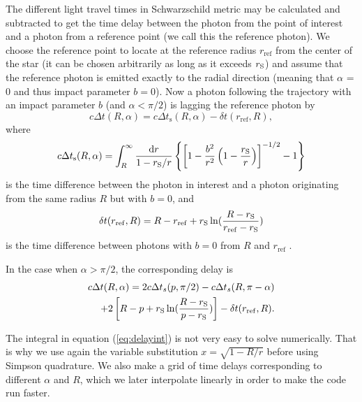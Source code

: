 \documentclass{wihuri}
\def\rg{r_{\rm S}} %
\def\be{\begin{equation}}
\def\ee{\end{equation}}
\def\d{{\rm d}}
\def\rg{r_{\rm S}} %
\begin{document}
The different light travel times in Schwarzschild metric may be calculated and subtracted to get the time delay between the photon from the point of interest and a photon from a reference point (we call this the reference photon). We choose the reference point to locate at the reference radius $r_{\mathrm{ref}}$ from the center of the star (it can be chosen arbitrarily as long as it exceeds $\rg$) and assume that the reference photon is emitted exactly to the radial direction (meaning that $\alpha$ = 0 and thus impact parameter $b = 0$). Now a photon following the trajectory with an impact parameter $b$ (and $\alpha < \pi/2$) is lagging the reference photon by 
\cite{pechenick}
\be \label{eq:delay2}
c\Delta t(R,\alpha)=  c\Delta t_{\mathrm{s}}(R,\alpha) -\delta t(r_{\mathrm{ref}},R),
\ee
where 
\be \label{eq:delayint}
c\Delta t_{\mathrm{s}}(R,\alpha) =
\int_R^{\infty} \frac{\d r}{1- \rg/r}
\left\{ \left[ 1-  \frac{b^2}{r^2}  \left( 1- \frac{\rg}{r} \right)
\right] ^{-1/2}  -1 \right\}
\ee
is the time difference between the photon in interest and a photon originating from the same radius $R$ but with $b=0$, and
\be
\delta t(r_{\mathrm{ref}},R) = R-r_{\mathrm{ref}}+\rg\ln(\frac{R-\rg}{r_{\mathrm{ref}}-\rg})
\ee
is the time difference between photons with $b=0$ from $R$ and $r_{\mathrm{ref}}$ \cite{falkner}. 

In the case when $\alpha > \pi/2$, the corresponding delay is
\be\label{eq:delay22}
\begin{split}
c\Delta t(R,\alpha)= 2c\Delta t_{s}(p,\pi/2)-c\Delta t_{s}(R,\pi-\alpha)\\+2\left[ R-p+\rg\ln(\frac{R-\rg}{p-\rg})\right]-\delta t(r_{\mathrm{ref}},R).
\end{split}
\ee

The integral in equation (\ref{eq:delayint}) is not very easy to solve numerically. That is why we use again the variable substitution $x = \sqrt{1-R/r}$ before using Simpson quadrature. We also make a grid of time delays corresponding to different $\alpha$ and $R$, which we later interpolate linearly in order to make the code run faster.
\end{document}
